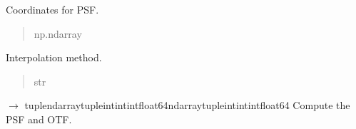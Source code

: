 \documentclass[letterpaper,10pt,english]{sphinxmanual}
\begin{document}
\begin{fulllineitems}

\begin{fulllineitems}
\label{\detokenize{source/OpticalSystems:OpticalSystems.OpticalSystem._psf_coordinates}}
\pysigstartsignatures
\pysigline
{}
\pysigstopsignatures
\sphinxAtStartPar
Coordinates for PSF.
\begin{quote}\begin{description}
\sphinxAtStartPar
np.ndarray

\end{description}\end{quote}

\end{fulllineitems}


\begin{fulllineitems}
\label{\detokenize{source/OpticalSystems:OpticalSystems.OpticalSystem._interpolation_method}}
\pysigstartsignatures
\pysigline
{}
\pysigstopsignatures
\sphinxAtStartPar
Interpolation method.
\begin{quote}\begin{description}
\sphinxAtStartPar
str

\end{description}\end{quote}

\end{fulllineitems}



\begin{fulllineitems}
\label{\detokenize{source/OpticalSystems:OpticalSystems.OpticalSystem.compute_psf_and_otf}}
\pysigstartsignatures
\pysiglinewithargsret
{}
{}
{{ $\rightarrow$ tuple\DUrole{p}{{[}}ndarray\DUrole{p}{{[}}tuple\DUrole{p}{{[}}intintint\DUrole{p}{{]}}float64\DUrole{p}{{]}}ndarray\DUrole{p}{{[}}tuple\DUrole{p}{{[}}intintint\DUrole{p}{{]}}float64\DUrole{p}{{]}}\DUrole{p}{{]}}}}
\pysigstopsignatures
\sphinxAtStartPar
Compute the PSF and OTF.


\end{fulllineitems}
\end{fulllineitems}
\end{document}
